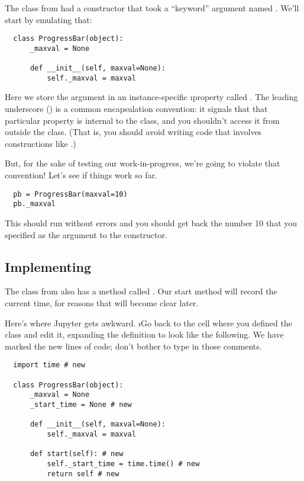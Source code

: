 \documentclass[letterpaper, 12pt, titlepage, twoside]{article}
\begin{document}
The  class from  had a constructor that took a
``keyword'' argument named . We'll start by emulating that:

\begin{lstlisting}
  class ProgressBar(object):
      _maxval = None

      def __init__(self, maxval=None):
          self._maxval = maxval
\end{lstlisting}

Here we store the  argument in an instance-specific \i{property}
called . The leading underscore (\s{\_}) is a common encapsulation
convention: it signals that that particular property is internal to the class,
and you shouldn't access it from outside the class. (That is, you should avoid
writing code that involves constructions like
.)

But, for the sake of testing our work-in-progress, we're going to violate that
convention! Let's see if things work so far.

\begin{lstlisting}
  pb = ProgressBar(maxval=10)
  pb._maxval
\end{lstlisting}

This should run without errors and you should get back the number 10 that you
specified as the  argument to the constructor.

\subsection*{Implementing }

The  class from  also has a method called
. Our start method will record the current time, for reasons that
will become clear later.

Here's where Jupyter gets awkward. \i{Go back to the cell where you defined
  the  class and edit it}, expanding the definition to look
like the following. We have marked the new lines of code; don't bother to type
in those comments.

\begin{lstlisting}
  import time # new

  class ProgressBar(object):
      _maxval = None
      _start_time = None # new

      def __init__(self, maxval=None):
          self._maxval = maxval

      def start(self): # new
          self._start_time = time.time() # new
          return self # new
\end{lstlisting}
\end{document}
